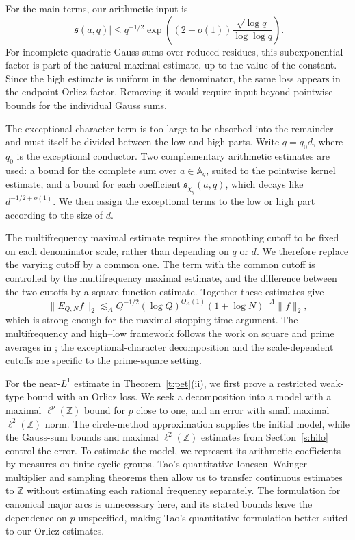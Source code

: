 \documentclass[12pt,reqno]{amsart}
\numberwithin{equation}{section}
\theoremstyle{definition}
\theoremstyle{remark}
\begin{document}
For the main terms, our arithmetic input is
\[
 |\mathfrak s(a,q)|
 \leq q^{-1/2}
 \exp\left((2+o(1))
 \frac{\sqrt{\log q}}{\log\log q}\right).
\]
For incomplete quadratic Gauss sums over reduced residues, this
subexponential factor is part of the natural maximal estimate, up to the
value of the constant.  Since the high estimate is uniform in the
denominator, the same loss appears in the endpoint Orlicz factor.  Removing
it would require input beyond pointwise bounds for the individual Gauss
sums.

The exceptional-character term is too large to be absorbed into the
remainder and must itself be divided between the low and high parts.
Write \(q=q_0d\), where \(q_0\) is the exceptional conductor.  Two
complementary arithmetic estimates are used: a bound for the complete
sum over \(a\in\mathbb A_q\), suited to the pointwise kernel estimate,
and a bound for each coefficient
\(\mathfrak s_{\chi_q}(a,q)\), which decays like
\(d^{-1/2 + o(1)}\).
We then assign the exceptional terms to the low or high part according
to the size of \(d\).

The multifrequency maximal estimate requires the smoothing cutoff to be
fixed on each denominator scale, rather than depending on \(q\) or
\(d\).  We therefore replace the varying cutoff by a common one.  The
term with the common cutoff is controlled by the multifrequency maximal
estimate, and the difference between the two cutoffs by a square-function
estimate.
Together these estimates give
\[
 \|E_{Q,N}f\|_2
 \lesssim_A Q^{-1/2}(\log Q)^{O_A(1)}
 (1+\log N)^{-A}\|f\|_2,
\]
which is strong enough for the maximal stopping-time argument.  The
multifrequency and high--low framework follows the work on square and
prime averages in \cite{LHF,HLKF,LMR}; the exceptional-character
decomposition and the scale-dependent cutoffs are specific to the
prime-square setting.





\medskip

For the near-\(L^1\) estimate in Theorem~\ref{t:pet}\textup{(ii)},
we first prove a restricted weak-type bound with an Orlicz loss.
We seek a decomposition into a model with a maximal
\(\ell^p(\mathbb Z)\) bound for \(p\) close to one, and an error
with small maximal \(\ell^2(\mathbb Z)\) norm.
The circle-method approximation supplies the initial model,
while the Gauss-sum bounds and maximal \(\ell^2(\mathbb Z)\)
estimates from Section~\ref{s:hilo} control the error.
To estimate the model, we represent its arithmetic coefficients
by measures on finite cyclic groups.
Tao's quantitative Ionescu--Wainger multiplier and sampling
theorems \cite{Tao2021} then allow us to transfer continuous
estimates to \(\mathbb Z\) without estimating each rational
frequency separately. The formulation for canonical major arcs \cite{mirekcanonical} is unnecessary here,
and its stated bounds leave the dependence on \(p\) unspecified,
making Tao's quantitative formulation better suited to our
Orlicz estimates.
\end{document}
